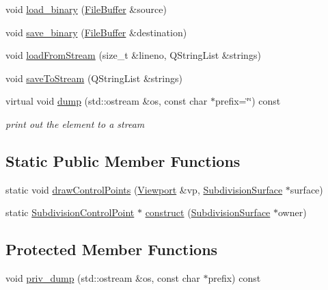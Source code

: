 \begin{DoxyCompactItemize}
\item 
void \hyperlink{classShipCAD_1_1SubdivisionControlPoint_a989c801ca1c836ca73f77c68d719f546}{load\-\_\-binary} (\hyperlink{classShipCAD_1_1FileBuffer}{File\-Buffer} \&source)
\item 
void \hyperlink{classShipCAD_1_1SubdivisionControlPoint_a7de1a32ae9e845478ec1bd5eaec17cd1}{save\-\_\-binary} (\hyperlink{classShipCAD_1_1FileBuffer}{File\-Buffer} \&destination)
\item 
void \hyperlink{classShipCAD_1_1SubdivisionControlPoint_aba97c3c0d7ebfcd98458931645ffacd0}{load\-From\-Stream} (size\-\_\-t \&lineno, Q\-String\-List \&strings)
\item 
void \hyperlink{classShipCAD_1_1SubdivisionControlPoint_aa9175d20a34a9b3e964efbb436ac3dbc}{save\-To\-Stream} (Q\-String\-List \&strings)
\item 
virtual void \hyperlink{classShipCAD_1_1SubdivisionControlPoint_a4a9d6e45291c27f19f0d76c9b9d19048}{dump} (std\-::ostream \&os, const char $\ast$prefix=\char`\"{}\char`\"{}) const 
\begin{DoxyCompactList}\small\item\em print out the element to a stream \end{DoxyCompactList}\end{DoxyCompactItemize}
\subsection*{Static Public Member Functions}
\begin{DoxyCompactItemize}
\item 
static void \hyperlink{classShipCAD_1_1SubdivisionControlPoint_a761599371138b34be2c7a2cac3699e2c}{draw\-Control\-Points} (\hyperlink{classShipCAD_1_1Viewport}{Viewport} \&vp, \hyperlink{classShipCAD_1_1SubdivisionSurface}{Subdivision\-Surface} $\ast$surface)
\item 
static \hyperlink{classShipCAD_1_1SubdivisionControlPoint}{Subdivision\-Control\-Point} $\ast$ \hyperlink{classShipCAD_1_1SubdivisionControlPoint_adc189f3e5cff85ecd1a59356e0f7d63d}{construct} (\hyperlink{classShipCAD_1_1SubdivisionSurface}{Subdivision\-Surface} $\ast$owner)
\end{DoxyCompactItemize}
\subsection*{Protected Member Functions}
\begin{DoxyCompactItemize}
\item 
void \hyperlink{classShipCAD_1_1SubdivisionControlPoint_a01e1eff38ecb4393948db0d9883cad84}{priv\-\_\-dump} (std\-::ostream \&os, const char $\ast$prefix) const 
\end{DoxyCompactItemize}

